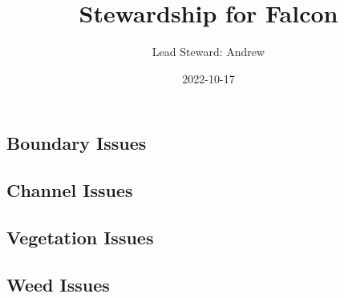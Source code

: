 \documentclass[
  landscape]{article}
\title{Stewardship for Falcon}
\author{Lead Steward: Andrew}
\date{2022-10-17}
\begin{document}
\maketitle

\hypertarget{boundary-issues}{%
\subsection{Boundary Issues}\label{boundary-issues}}

\textbar\textbar{} \textbar\textbar{} \textbar\textbar{}
\textbar\textbar{}

\hypertarget{channel-issues}{%
\subsection{Channel Issues}\label{channel-issues}}

\textbar\textbar{} \textbar\textbar{} \textbar\textbar{}
\textbar\textbar{}

\newpage

\hypertarget{vegetation-issues}{%
\subsection{Vegetation Issues}\label{vegetation-issues}}

\textbar\textbar{} \textbar\textbar{} \textbar\textbar{}
\textbar\textbar{}

\newpage

\hypertarget{weed-issues}{%
\subsection{Weed Issues}\label{weed-issues}}
\end{document}
